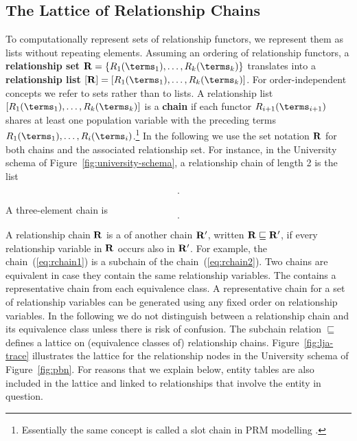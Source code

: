 \subsection{The Lattice of Relationship Chains} 
To computationally represent sets of relationship functors, we represent them as lists without repeating elements. Assuming an ordering of relationship functors, a \textbf{relationship set} $\set{\Relation} = \{\Relation_{1}(\terms_{1}),\ldots,\Relation_{k}(\terms_{k})\}$ translates into a \textbf{relationship list} $[\set{\Relation}]=[\Relation_{1}(\terms_{1}),\ldots,\Relation_{k}(\terms_{k})]$. For order-independent concepts we refer to sets rather than to lists.
A relationship list $[\Relation_{1}(\terms_{1}),\ldots,\Relation_{k}(\terms_{k})]$ is a \textbf{chain} if each functor $\Relation_{i+1}(\terms_{i+1})$ shares at least one population variable with the preceding terms $\Relation_{1}(\terms_{1}),\ldots,\Relation_{i}(\terms_{i})$.\footnote{Essentially the same concept is called a slot chain in PRM modelling \cite{Getoor2007c}.} In the following we use the set notation $\mathbf{R}$ for both chains and the associated relationship set. %
For instance, in the University schema of Figure~\ref{fig:university-schema}, a relationship 
chain of length 2 is the list 

\begin{equation}
[\it{RA}(\P,\S),\it{Registered}(\S,\C)]. \label{eq:rchain1}
\end{equation} 

A three-element chain is 
\begin{equation}
[\it{RA}(\P,\S),\it{Registered}(\S,\C),\it{TA}(\C,S)]. \label{eq:rchain2}
\end{equation}

 A relationship chain $\mathbf{R}$ is a  of another chain $\mathbf{R'}$, written $\mathbf{R} \sqsubseteq \mathbf{R'}$, if every relationship variable in $\mathbf{R}$ occurs also in $\mathbf{R'}$. For example, the chain~(\ref{eq:rchain1}) is a subchain of the chain~(\ref{eq:rchain2}).
Two chains are equivalent in case they contain the same relationship variables. 
The  contains a representative chain from each equivalence class. A representative chain for a set of relationship variables can be generated using any fixed order on relationship variables. In the following we do not distinguish between a relationship chain and its equivalence class unless there is risk of confusion.  The
subchain relation $\sqsubseteq$ defines a lattice on (equivalence classes of) relationship chains. Figure~\ref{fig:lja-trace} illustrates the  lattice for the relationship nodes in the University schema of Figure~\ref{fig:pbn}. For reasons that we explain below, entity tables are also included in the lattice and linked to relationships that involve the entity in question. 




